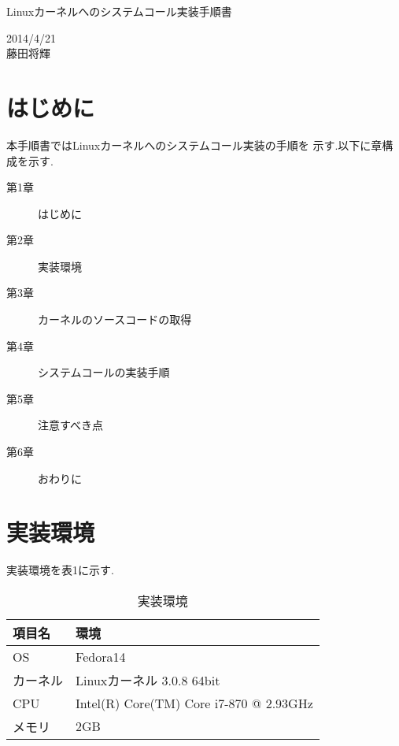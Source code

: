 \documentclass[12pt]{jsarticle}
\begin{document}

\begin{center}
{\LARGE Linuxカーネルへのシステムコール実装手順書}
\end{center}

\begin{flushright}
  2014/4/21\\
  藤田将輝
\end{flushright}

\section{はじめに}
本手順書ではLinuxカーネルへのシステムコール実装の手順を
示す.以下に章構成を示す.
\begin{description}
\item[第1章]はじめに
\item[第2章]実装環境
\item[第3章]カーネルのソースコードの取得
\item[第4章]システムコールの実装手順
\item[第5章]注意すべき点
\item[第6章]おわりに
\end{description}


\section{実装環境}
実装環境を表1に示す.
\begin{table}[htbp]
\caption{実装環境}
\label{kankyou}
\begin{center}
\begin{tabular}{|l|l|}   \hline 
項目名      & 環境    \\ \hline \hline
OS          & Fedora14  \\ \hline
カーネル    & Linuxカーネル 3.0.8 64bit   \\ \hline
CPU         & Intel(R) Core(TM) Core i7-870 @ 2.93GHz \\ \hline
メモリ      & 2GB \\  \hline
           
\end{tabular}
\end{center}
\end{table}
\end{document}
